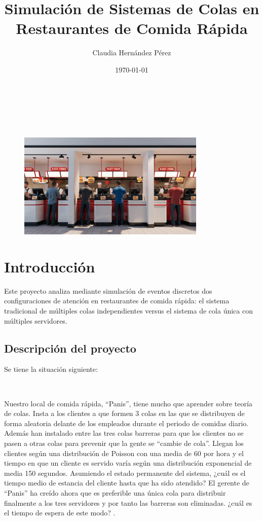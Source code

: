 \documentclass{article}
\title{Simulación de Sistemas de Colas en Restaurantes de Comida Rápida}
\author{Claudia Hernández Pérez}
\date{\today}
\begin{document}
\maketitle

\

\

\begin{figure}[h]
\centering
\includegraphics[width=0.8\textwidth]{./images/restaurant.jpg}
\end{figure}

\newpage

\tableofcontents

\newpage

\section{Introducción}\label{sec:introduccion}
Este proyecto analiza mediante simulación de eventos discretos dos configuraciones de atención en restaurantes de comida rápida: el sistema tradicional de múltiples colas independientes versus el sistema de cola única con múltiples servidores.

\subsection{Descripción del proyecto}
Se tiene la situación siguiente: 

\

Nuestro local de comida rápida, “Panis”, tiene mucho que aprender sobre teoría 
de colas. Insta a los clientes a que formen 3 colas en las que se distribuyen de 
forma aleatoria delante de los empleados durante el periodo de comidas diario. 
Además han instalado entre las tres colas barreras para que los clientes no se 
pasen a otras colas para prevenir que la gente se “cambie de cola”. Llegan los 
clientes según una distribución de Poisson con una media de 60 por hora y el 
tiempo en que un cliente es servido varía según una distribución exponencial de 
media 150 segundos. Asumiendo el estado permanente del sistema, ¿cuál es el 
tiempo medio de estancia del cliente hasta que ha sido atendido? El gerente de 
“Panis” ha creído ahora que es preferible una única cola para distribuir finalmente a 
los tres servidores y por tanto las barreras son eliminadas. ¿cuál es el tiempo de 
espera de este modo? \cite{autor2015}.
\end{document}
